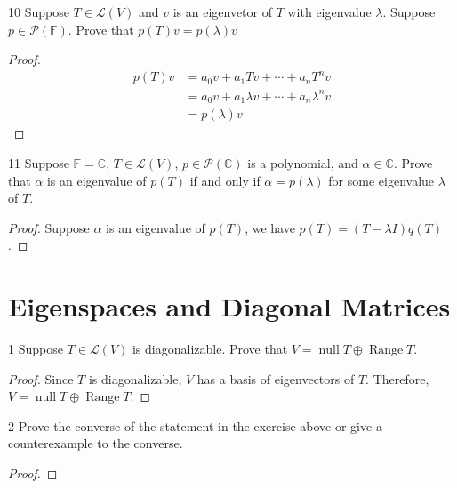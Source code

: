 \documentclass{article}
\newenvironment{problem}[1]{\begin{prob*}{#1}{}}{\end{prob*}}
\DeclareMathOperator{\Null}{null}
\begin{document}
\begin{problem}{10}
Suppose $T \in \mathcal{L}(V)$ and $v$ is an eigenvetor of $T$ with eigenvalue $\lambda$. Suppose $p \in \mathcal{P}(\mathbb{F})$. Prove that $p(T)v = p(\lambda)v$
\end{problem}
\begin{proof}
	\begin{equation*}
		\begin{aligned}
			p(T)v & = a_0v + a_1Tv + \cdots + a_nT^{n}v              \\
			      & = a_0v + a_1\lambda v + \cdots + a_n\lambda^{n}v \\
			      & = p(\lambda)v
		\end{aligned}
	\end{equation*}
\end{proof}

\begin{problem}{11}
Suppose $\mathbb{F} = \mathbb{C}$, $T \in \mathcal{L}(V)$, $p \in \mathcal{P}(\mathbb{C})$ is a polynomial, and $\alpha \in \mathbb{C}$. Prove that $\alpha$ is an eigenvalue of $p(T)$ if and only if $\alpha = p(\lambda)$ for some eigenvalue $\lambda$ of $T$.
\end{problem}
\begin{proof}
	Suppose $\alpha$ is an eigenvalue of $p(T)$,
	we have $p(T) = (T-\lambda I)q(T)$.
\end{proof}

\section{Eigenspaces and Diagonal Matrices}

\begin{problem}{1}
Suppose $T \in \mathcal{L}(V)$ is diagonalizable. Prove that $V = \Null T \oplus \operatorname{Range} T$.
\end{problem}
\begin{proof}
	Since $T$ is diagonalizable, $V$ has a basis of eigenvectors of $T$.
	Therefore, $V = \Null T \oplus \operatorname{Range} T$.
\end{proof}

\begin{problem}{2}
Prove the converse of the statement in the exercise above
or give a counterexample to the converse.
\end{problem}
\begin{proof}
\end{proof}
\end{document}
